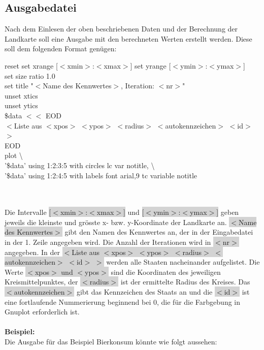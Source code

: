 \documentclass[a4paper,11pt]{article}
\newcommand*{\mybox}[2]{\colorbox{#1!30}{\parbox{.98\linewidth}{#2}}}
\begin{document}
{\subsection{Ausgabedatei}
Nach dem Einlesen der oben beschriebenen Daten und der Berechnung der Landkarte soll eine Ausgabe mit den berechneten Werten erstellt werden.
Diese soll dem folgenden Format gen\"ugen:
\mybox{background}{
reset
set xrange [$<$xmin$>$:$<$xmax$>$]
set yrange [$<$ymin$>$:$<$ymax$>$]\\
set size ratio 1.0\\
set title "$<$Name des Kennwertes$>$, Iteration: $<$nr$>$"\\
unset xtics\\
unset ytics\\
\$data $<<$ EOD\\
$<$Liste aus $<$xpos$>$ $<$ypos$>$ $<$radius$>$ $<$autokennzeichen$>$ $<$id$>$ $>$\\
EOD\\
plot \textbackslash\\
'\$data' using 1:2:3:5 with circles lc var notitle, \textbackslash\\
'\$data' using 1:2:4:5 with labels font \grqq{}arial,9\grqq{}  tc variable notitle\\
}
\\
\\
Die Intervalle \colorbox{lightgray}{[$<$xmin$>$:$<$xmax$>$]} und \colorbox{lightgray}{[$<$ymin$>$:$<$ymax$>$]} geben jeweils die kleinste und gr\"osste x- bzw. y-Koordinate der Landkarte an.
\colorbox{lightgray}{$<$Name des Kennwertes$>$} gibt den Namen des Kennwertes an, der in der Eingabedatei in der 1. Zeile angegeben wird.
Die Anzahl der Iterationen wird in \colorbox{lightgray}{$<$nr$>$} angegeben.
In der \colorbox{lightgray}{$<$Liste aus $<$xpos$>$ $<$ypos$>$ $<$radius$>$ $<$autokennzeichen$>$ $<$id$>$ $>$} werden alle Staaten nacheinander aufgelistet. Die Werte
\colorbox{lightgray}{$<$xpos$>$ und $<$ypos$>$} sind die Koordinaten des jeweiligen Kreismittelpunktes, der \colorbox{lightgray}{$<$radius$>$} ist der ermittelte Radius des Kreises.
Das \colorbox{lightgray}{$<$autokennzeichen$>$} gibt das Kennzeichen des Staats an und die \colorbox{lightgray}{$<$id$>$} ist eine fortlaufende Nummerierung beginnend bei 0, die f\"ur die 
Farbgebung in Gnuplot erforderlich ist.\\
\vspace{40mm}\\
\textbf{Beispiel:}\\
\vbox{
Die Ausgabe f\"ur das Beispiel \glqq{}Bierkonsum\grqq{} k\"onnte wie folgt aussehen:\\
}}
\end{document}
